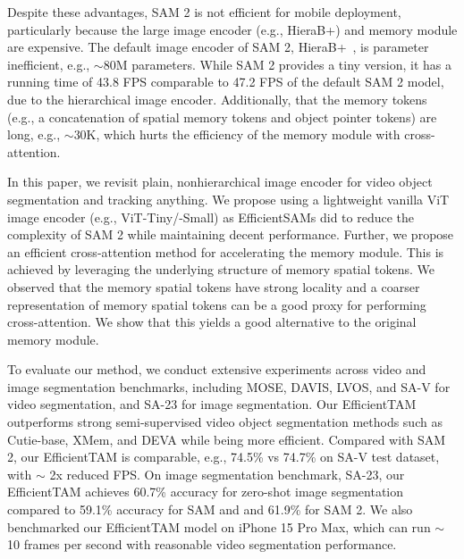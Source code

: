 Despite these advantages, SAM 2 is not efficient for mobile deployment, particularly because the large image encoder (e.g., HieraB+) and memory module are expensive. The default image encoder of SAM 2, HieraB+~\citep{ryali2023hiera}, is parameter inefficient, e.g., $\sim$80M parameters. While SAM 2 provides a tiny version, it has a running time of 43.8 FPS comparable to 47.2 FPS of the default SAM 2 model, due to the hierarchical image encoder. Additionally, that the memory tokens (e.g., a concatenation of spatial memory tokens and object pointer tokens) are long, e.g., $\sim$30K, which hurts the efficiency of the memory module with cross-attention. 

In this paper, we revisit plain, nonhierarchical image encoder for video object segmentation and tracking anything. We propose using a lightweight vanilla ViT image encoder (e.g., ViT-Tiny/-Small\citep{touvron2021training}) as EfficientSAMs\citep{xiong2024efficientsam} did to reduce the complexity of SAM 2 while maintaining decent performance. Further, we propose an efficient cross-attention method for accelerating the memory module. This is achieved by leveraging the underlying structure of memory spatial tokens. We observed that the memory spatial tokens have strong locality and a coarser representation of memory spatial tokens can be a good proxy for performing cross-attention. We show that this yields a good alternative to the original memory module. 

To evaluate our method, we conduct extensive experiments across video and image segmentation benchmarks, including MOSE, DAVIS, LVOS, and SA-V for video segmentation, and SA-23 for image segmentation. Our EfficientTAM outperforms strong semi-supervised video object segmentation methods such as Cutie-base, XMem, and DEVA while being more efficient. Compared with SAM 2, our EfficientTAM is comparable, e.g., 74.5\% vs 74.7\% on SA-V test dataset, with $\sim$ 2x reduced FPS. On image segmentation benchmark, SA-23, our EfficientTAM achieves 60.7\% accuracy for zero-shot image segmentation compared to 59.1\% accuracy for SAM and and 61.9\% for SAM 2. We also benchmarked our EfficientTAM model on iPhone 15 Pro Max, which can run $\sim$ 10 frames per second with reasonable video segmentation performance.

